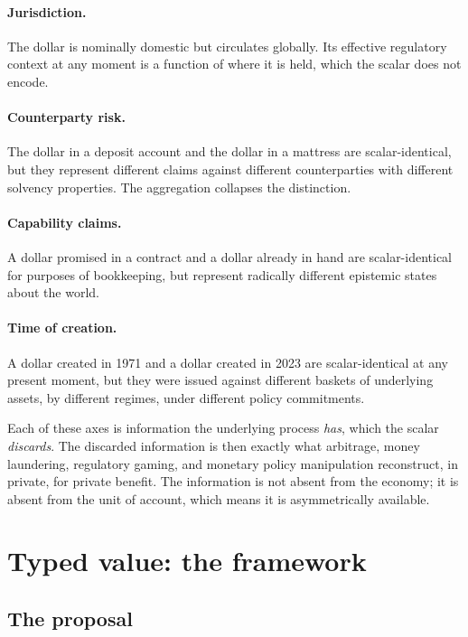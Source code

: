 \documentclass[11pt]{article}
\begin{document}
\paragraph{Jurisdiction.} The dollar is nominally domestic but circulates globally. Its effective regulatory context at any moment is a function of where it is held, which the scalar does not encode.

\paragraph{Counterparty risk.} The dollar in a deposit account and the dollar in a mattress are scalar-identical, but they represent different claims against different counterparties with different solvency properties. The aggregation collapses the distinction.

\paragraph{Capability claims.} A dollar promised in a contract and a dollar already in hand are scalar-identical for purposes of bookkeeping, but represent radically different epistemic states about the world.

\paragraph{Time of creation.} A dollar created in 1971 and a dollar created in 2023 are scalar-identical at any present moment, but they were issued against different baskets of underlying assets, by different regimes, under different policy commitments.

Each of these axes is information the underlying process \emph{has}, which the scalar \emph{discards}. The discarded information is then exactly what arbitrage, money laundering, regulatory gaming, and monetary policy manipulation reconstruct, in private, for private benefit. The information is not absent from the economy; it is absent from the unit of account, which means it is asymmetrically available.

\section{Typed value: the framework}

\subsection{The proposal}
\end{document}
